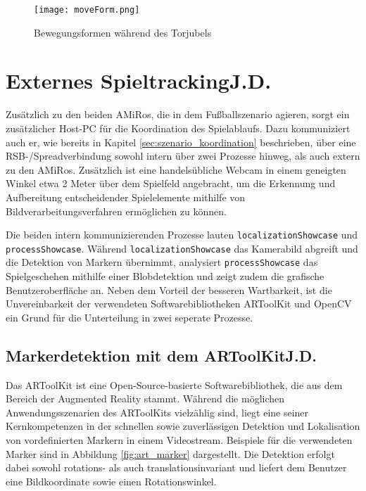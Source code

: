 \begin{figure}[h]
	\begin{center}
		\texttt{[image: moveForm.png]} 	
		\caption{Bewegungsformen während des Torjubels}
		\label{fig:moveForm}
	\end{center}
\end{figure}

\section[Externes Spieltracking]{Externes Spieltracking\hfill {\normalsize J.D.}} %

Zusätzlich zu den beiden AMiRos, die in dem Fußballszenario agieren, sorgt ein zusätzlicher Host-PC für die Koordination des Spielablaufs. Dazu kommuniziert auch er, wie bereits in Kapitel \ref{sec:szenario_koordination} beschrieben, über eine RSB-/Spreadverbindung sowohl intern über zwei Prozesse hinweg, als auch extern zu den AMiRos. Zusätzlich ist eine handelsübliche Webcam in einem geneigten Winkel etwa 2 Meter über dem Spielfeld angebracht, um die Erkennung und Aufbereitung entscheidender Spielelemente mithilfe von Bildverarbeitungsverfahren ermöglichen zu können.

Die beiden intern kommunizierenden Prozesse lauten \texttt{localizationShowcase} und \texttt{processShowcase}. Während \texttt{localizationShowcase} das Kamerabild abgreift und die Detektion von Markern übernimmt, analysiert \texttt{processShowcase} das Spielgeschehen mithilfe einer Blobdetektion und zeigt zudem die grafische Benutzeroberfläche an. Neben dem Vorteil der besseren Wartbarkeit, ist die Unvereinbarkeit der verwendeten Softwarebibliotheken ARToolKit und OpenCV ein Grund für die Unterteilung in zwei seperate Prozesse.

\subsection[Markerdetektion mit dem ARToolKit]{Markerdetektion mit dem ARToolKit\hfill {\normalsize J.D.}} %

Das ARToolKit ist eine Open-Source-basierte Softwarebibliothek, die aus dem Bereich der Augmented Reality stammt. Während die möglichen Anwendungsszenarien des ARToolKits vielzählig sind, liegt eine seiner Kernkompetenzen in der schnellen sowie zuverlässigen Detektion und Lokalisation von vordefinierten Markern in einem Video\-stream. Beispiele für die verwendeten Marker sind in Abbildung \ref{fig:art_marker} dargestellt. Die Detektion erfolgt dabei sowohl rotations- als auch translationsinvariant und liefert dem Benutzer eine Bildkoordinate sowie einen Rotationswinkel.

